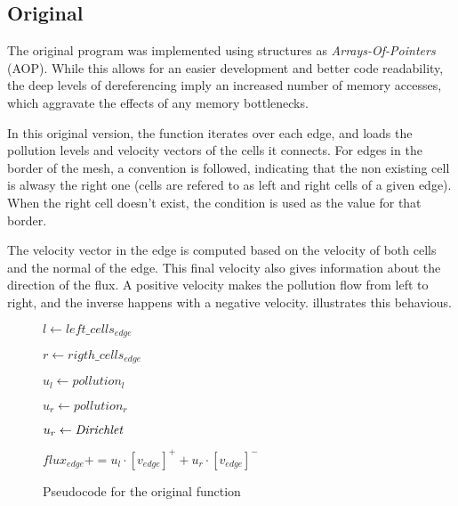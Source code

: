 \subsection{Original}
\label{sec:310}

The original \polu program was implemented using structures as \textit{Arrays-Of-Pointers} (AOP). While this allows for an easier development and better code readability, the deep levels of dereferencing imply an increased number of memory accesses, which aggravate the effects of any memory bottlenecks.

In this original version, the \computeflux function iterates over each edge, and loads the pollution levels and velocity vectors of the cells it connects. For edges in the border of the mesh, a convention is followed, indicating that the non existing cell is alwasy the right one (cells are refered to as left and right cells of a given edge). When the right cell doesn't exist, the \dirichlet condition is used as the value for that border.

The velocity vector in the edge is computed based on the velocity of both cells and the normal of the edge. This final velocity also gives information about the direction of the flux. A positive velocity makes the pollution flow from left to right, and the inverse happens with a negative velocity.  illustrates this behavious.



\begin{figure}[!htp]
	\begin{alg}

			$l     \gets left\_cells_{edge}$

			$r     \gets rigth\_cells_{edge}$

			$u_{l} \gets pollution_{l}$


				$u_{r} \gets pollution_{r}$
			\Else

				$u_{r} \gets \textit{Dirichlet}$
			\EndIf


			$flux_{edge} += u_{l} \cdot [v_{edge}]^{+} + u_{r} \cdot [v_{edge}]^{-}$
		\EndFor
	\end{alg}

	\caption{Pseudocode for the original \computeflux function}
	\label{alg:flux}
\end{figure}

